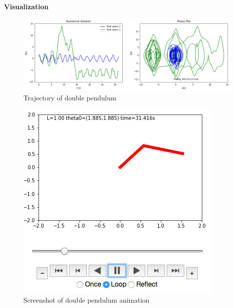 \begin{problem}{1}
\textbf{Visualization}

\begin{figure}[ht!]
	\centering
	\includegraphics[scale=0.6]{../figures/t=10pi_th0=(05,05)pidoublePend.png}
	\caption{Trajectory of double pendulum}
	\label{double}
\end{figure}

\begin{figure}[ht!]
	\centering
	\includegraphics[scale=0.5]{../figures/doublePendAnim.png}
	\caption{Screenshot of double pendulum animation}
	\label{anim}
\end{figure}

\end{problem}

